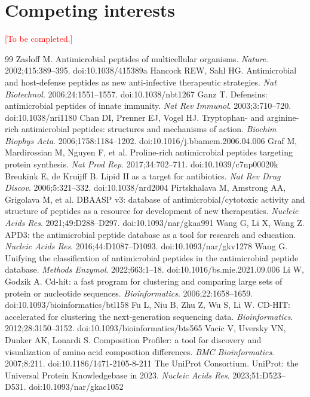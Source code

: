 \documentclass[11pt,a4paper]{article}
\newcommand{\todo}[1]{\textcolor{red}{[#1]}}
\begin{document}
\section*{Competing interests}
\todo{To be completed.}

\begin{thebibliography}{99}\small
{} Zasloff M. Antimicrobial peptides of multicellular organisms. \emph{Nature}. 2002;415:389--395. doi:10.1038/415389a
 Hancock REW, Sahl HG. Antimicrobial and host-defense peptides as new anti-infective therapeutic strategies. \emph{Nat Biotechnol}. 2006;24:1551--1557. doi:10.1038/nbt1267
 Ganz T. Defensins: antimicrobial peptides of innate immunity. \emph{Nat Rev Immunol}. 2003;3:710--720. doi:10.1038/nri1180
 Chan DI, Prenner EJ, Vogel HJ. Tryptophan- and arginine-rich antimicrobial peptides: structures and mechanisms of action. \emph{Biochim Biophys Acta}. 2006;1758:1184--1202. doi:10.1016/j.bbamem.2006.04.006
 Graf M, Mardirossian M, Nguyen F, et al. Proline-rich antimicrobial peptides targeting protein synthesis. \emph{Nat Prod Rep}. 2017;34:702--711. doi:10.1039/c7np00020k
 Breukink E, de Kruijff B. Lipid II as a target for antibiotics. \emph{Nat Rev Drug Discov}. 2006;5:321--332. doi:10.1038/nrd2004
 Pirtskhalava M, Amstrong AA, Grigolava M, et al. DBAASP v3: database of antimicrobial/cytotoxic activity and structure of peptides as a resource for development of new therapeutics. \emph{Nucleic Acids Res}. 2021;49:D288--D297. doi:10.1093/nar/gkaa991
 Wang G, Li X, Wang Z. APD3: the antimicrobial peptide database as a tool for research and education. \emph{Nucleic Acids Res}. 2016;44:D1087--D1093. doi:10.1093/nar/gkv1278
 Wang G. Unifying the classification of antimicrobial peptides in the antimicrobial peptide database. \emph{Methods Enzymol}. 2022;663:1--18. doi:10.1016/bs.mie.2021.09.006
 Li W, Godzik A. Cd-hit: a fast program for clustering and comparing large sets of protein or nucleotide sequences. \emph{Bioinformatics}. 2006;22:1658--1659. doi:10.1093/bioinformatics/btl158
 Fu L, Niu B, Zhu Z, Wu S, Li W. CD-HIT: accelerated for clustering the next-generation sequencing data. \emph{Bioinformatics}. 2012;28:3150--3152. doi:10.1093/bioinformatics/bts565
 Vacic V, Uversky VN, Dunker AK, Lonardi S. Composition Profiler: a tool for discovery and visualization of amino acid composition differences. \emph{BMC Bioinformatics}. 2007;8:211. doi:10.1186/1471-2105-8-211
 The UniProt Consortium. UniProt: the Universal Protein Knowledgebase in 2023. \emph{Nucleic Acids Res}. 2023;51:D523--D531. doi:10.1093/nar/gkac1052
\end{thebibliography}
\end{document}

